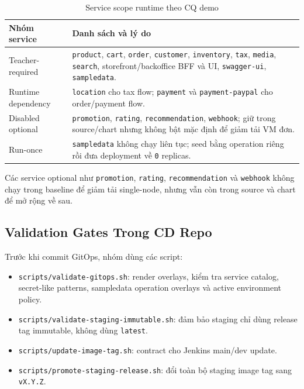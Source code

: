 \begin{table}[H]
\centering
\caption{Service scope runtime theo CQ demo}
\begin{tabular}{|p{3.4cm}|p{10cm}|}
\hline
\textbf{Nhóm service} & \textbf{Danh sách và lý do} \\
\hline
Teacher-required & \texttt{product}, \texttt{cart}, \texttt{order}, \texttt{customer}, \texttt{inventory}, \texttt{tax}, \texttt{media}, \texttt{search}, storefront/backoffice BFF và UI, \texttt{swagger-ui}, \texttt{sampledata}. \\
\hline
Runtime dependency & \texttt{location} cho tax flow; \texttt{payment} và \texttt{payment-paypal} cho order/payment flow. \\
\hline
Disabled optional & \texttt{promotion}, \texttt{rating}, \texttt{recommendation}, \texttt{webhook}; giữ trong source/chart nhưng không bật mặc định để giảm tải VM đơn. \\
\hline
Run-once & \texttt{sampledata} không chạy liên tục; seed bằng operation riêng rồi đưa deployment về \texttt{0} replicas. \\
\hline
\end{tabular}
\end{table}

Các service optional như \texttt{promotion}, \texttt{rating}, \texttt{recommendation}
và \texttt{webhook} không chạy trong baseline để giảm tải single-node, nhưng vẫn còn
trong source và chart để mở rộng về sau.

\subsection{Validation Gates Trong CD Repo}

Trước khi commit GitOps, nhóm dùng các script:

\begin{itemize}\sloppy
    \item \texttt{scripts/}\allowbreak\texttt{validate-gitops.sh}: render overlays, kiểm tra service catalog, secret-like patterns, sampledata operation overlays và active environment policy.
    \item \texttt{scripts/}\allowbreak\texttt{validate-}\allowbreak\texttt{staging-}\allowbreak\texttt{immutable.sh}: đảm bảo staging chỉ dùng release tag immutable, không dùng \texttt{latest}.
    \item \texttt{scripts/}\allowbreak\texttt{update-image-tag.sh}: contract cho Jenkins main/dev update.
    \item \texttt{scripts/}\allowbreak\texttt{promote-staging-release.sh}: đổi toàn bộ staging image tag sang \texttt{vX.Y.Z}.
\end{itemize}

